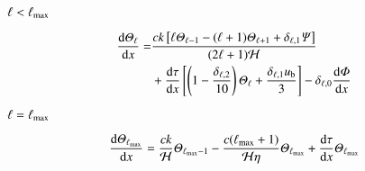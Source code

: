 \par \textcolor{blue}{$\ell < \ell_\mathrm{max}$}

\begin{equation}
\begin{split}
    \dv{\Theta_\ell}{x} = &\frac{ck\left[\ell \Theta_{\ell-1} - (\ell+1)\Theta_{\ell+1}+\delta_{\ell,1} \Psi\right]}{(2\ell +1) \Hp}  \\
    &+ \dv{\tau}{x}\left[\left(1 -\frac{\delta_{\ell,2}}{10}\right)\Theta_\ell+ \frac{\delta_{\ell,1} u\ped{b}}{3}\right] 
    - \delta_{\ell,0}\dv{\Phi}{x}%
\end{split}
\end{equation}


\par \textcolor{blue}{$\ell = \ell_\mathrm{max}$}

\begin{equation}
    \dv{\ensuremath{\varTheta}_{\ell\ensuremath{_\mathrm{max}}}}{x} = \frac{ck}{\mathcal{H}} \varTheta_{\ell_\mathrm{max}-1} - \frac{c(\ell_\mathrm{max}+1)}{\mathcal{H} \eta}\varTheta_{\ell_\mathrm{max}} + \dv{\tau}{x} \varTheta_{\ell_\mathrm{max}}
\end{equation}


